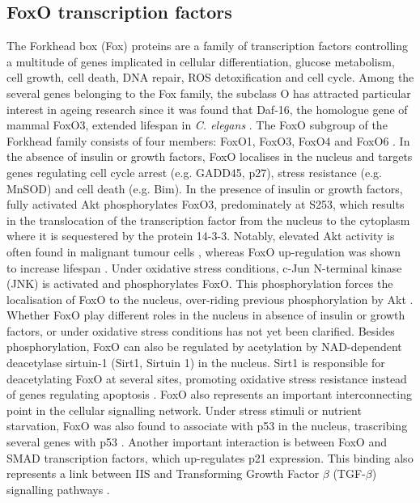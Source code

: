 \subsection{FoxO transcription factors}
\label{subsec:FoxO transcription factors}
The Forkhead box (Fox) proteins are a family of transcription factors controlling a multitude of genes implicated in cellular differentiation, glucose metabolism,  cell growth, cell death, DNA repair, ROS detoxification and cell cycle. Among the several genes belonging to the Fox family, the subclass O has attracted particular interest in ageing research since it was found that Daf-16, the homologue gene of mammal FoxO3, extended lifespan in \emph{C. elegans} \citep{Lin2001, Libina2003, Lehtinen2006}. The FoxO subgroup of the Forkhead family consists of four members: FoxO1, FoxO3, FoxO4 and FoxO6 \citep{Greer2005}. In the absence of insulin or growth factors, FoxO localises in the nucleus and targets genes regulating cell cycle arrest (e.g. GADD45, p27), stress resistance (e.g. MnSOD) and cell death (e.g. Bim). In the presence of insulin or growth factors, fully activated Akt phosphorylates FoxO3, predominately at S253, which results in the translocation of the transcription factor from the nucleus to the 
cytoplasm where it is sequestered by the protein 14-3-3. Notably, elevated Akt activity is often found in malignant tumour cells \citep{Hara2005}, whereas FoxO up-regulation was shown to increase lifespan \citep{Willcox2008, Kenyon2011}. Under oxidative stress conditions, c-Jun N-terminal kinase (JNK) is activated and phosphorylates FoxO. This phosphorylation forces the localisation of FoxO to the nucleus, over-riding previous phosphorylation by Akt \citep{Greer2005, Chaanine2012}. Whether FoxO play different roles in the nucleus in absence of insulin or growth factors, or under oxidative stress conditions has not yet been clarified. Besides phosphorylation, FoxO can also be regulated by acetylation by NAD-dependent deacetylase sirtuin-1 (Sirt1, Sirtuin 1) in the nucleus. Sirt1 is responsible for deacetylating FoxO at several sites, promoting oxidative stress resistance instead of genes regulating apoptosis \citep{Brunet2004}. FoxO also represents an important interconnecting point in the cellular 
signalling network. Under stress stimuli or nutrient starvation, FoxO was also found to associate with p53 in the nucleus, trascribing several genes with p53 \citep{Brunet2004}. Another important interaction is between FoxO and SMAD transcription factors, which up-regulates p21 expression. This binding also represents a link between IIS and Transforming Growth Factor $\beta$ (TGF-$\beta$) signalling pathways \citep{Seoane2004}.

